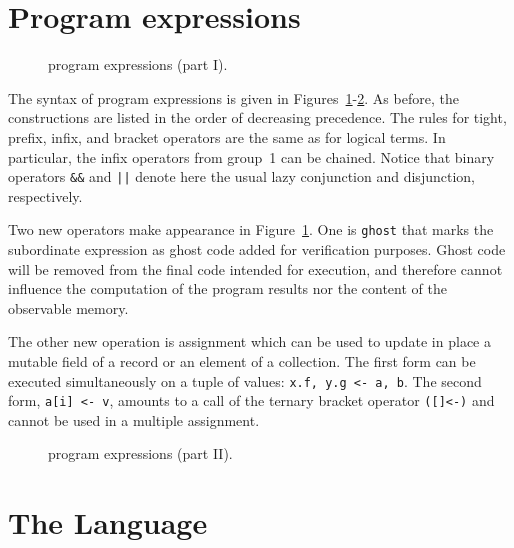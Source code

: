 \section{Program expressions}
\label{sec:exprs}

\begin{figure}[ht]
\begin{center}\end{center}
\caption{\whyml program expressions (part I).}
\label{fig:bnf:expr1}
\end{figure}

The syntax of program expressions is given in
Figures~\ref{fig:bnf:expr1}-\ref{fig:bnf:expr2}.
As before, the constructions are listed in the order of decreasing
precedence. The rules for tight, prefix, infix, and bracket operators
are the same as for logical terms. In particular, the infix operators
from group~1 can be chained. Notice that binary operators \texttt{\&\&}
and \texttt{||} denote here the usual lazy conjunction and disjunction,
respectively.

Two new operators make appearance in Figure~\ref{fig:bnf:expr1}.
One is \texttt{ghost} that marks the subordinate expression as
ghost code added for verification purposes. Ghost code will be
removed from the final code intended for execution, and therefore
cannot influence the computation of the program results nor the
content of the observable memory.

The other new operation is assignment which can be used to update
in place a mutable field of a record or an element of a collection.
The first form can be executed simultaneously
on a tuple of values: \texttt{x.f, y.g <- a, b}. The second
form, \texttt{a[i] <- v}, amounts to a call of the ternary
bracket operator \texttt{([]<-)} and cannot be used in a
multiple assignment.

\begin{figure}[ht]
\begin{center}\end{center}
\caption{\whyml program expressions (part II).}
\label{fig:bnf:expr2}
\end{figure}

\newpage


\section{The \why Language}


